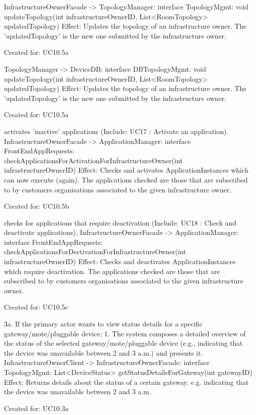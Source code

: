 {{{{{{{            InfrastructureOwnerFacade -> TopologyManager: interface TopologyMgmt: void updateTopology(int infrastructureOwnerID, List<RoomTopology> updatedTopology)
               Effect: Updates the topology of an infrastructure owner. The 'updatedTopology' is the new one submitted by the infrastructure owner.
               \item Created for: UC10.5a

            TopologyManager -> DeviceDB: interface DBTopologyMgmt: void updateTopology(int infrastructureOwnerID, List<RoomTopology> updatedTopology)
               Effect: Updates the topology of an infrastructure owner. The 'updatedTopology' is the new one submitted by the infrastructure owner.
               \item Created for: UC10.5a

           { activates 'inactive' applications (Include: UC17 : Activate an application).
            InfrastructureOwnerFacade -> ApplicationManager: interface FrontEndAppRequests: checkApplicationsForActivationForInfrastructureOwner(int infrastructureOwnerID)
                Effect: Checks and activates ApplicationInstances which can now execute (again). The applications checked are those that are subscribed to by customers organisations associated to the given infrastructure owner.
                \item Created for: UC10.5b

           { checks for applications that require deactivation (Include: UC18 : Check and deactivate applications).
            InfrastructureOwnerFacade -> ApplicationManager: interface FrontEndAppRequests: checkApplicationsForDectivationForInfrastructureOwner(int infrastructureOwnerID)
                Effect: Checks and deactivates ApplicationInstances which require deactivation. The applications checked are those that are subscribed to by customers organisations associated to the given infrastructure owner.
                \item Created for: UC10.5c

        3a. If the primary actor wants to view status details for a specific gateway/mote/pluggable device:
            1. The system composes a detailed overview of the status of the selected gateway/mote/pluggable device (e.g., indicating that the device was unavailable between 2 and 3 a.m.) and presents it.
                InfrastructureOwnerClient -> InfrastructureOwnerFacade: interface TopologyMgmt: List<DeviceStatus> getStatusDetailsForGateway(int gatewayID)
                    Effect: Returns details about the status of a certain gateway. e.g. indicating that the device was unavailable between 2 and 3 a.m.
                    \item Created for: UC10.3a

}}}}}}}}}
